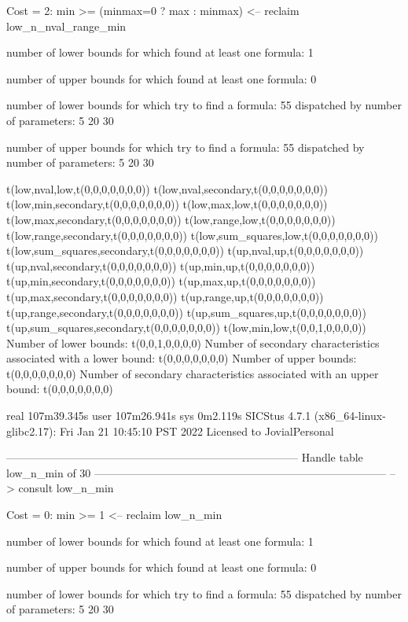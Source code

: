 Cost =  2:  min >= (minmax=0 ? max : minmax)
<-- reclaim low_n_nval_range_min

number of lower bounds for which found at least one formula: 1

number of upper bounds for which found at least one formula: 0

number of lower bounds for which try to find a formula: 55
dispatched by number of parameters: 5  20  30

number of upper bounds for which try to find a formula: 55
dispatched by number of parameters: 5  20  30

t(low,nval,low,t(0,0,0,0,0,0,0))
t(low,nval,secondary,t(0,0,0,0,0,0,0))
t(low,min,secondary,t(0,0,0,0,0,0,0))
t(low,max,low,t(0,0,0,0,0,0,0))
t(low,max,secondary,t(0,0,0,0,0,0,0))
t(low,range,low,t(0,0,0,0,0,0,0))
t(low,range,secondary,t(0,0,0,0,0,0,0))
t(low,sum_squares,low,t(0,0,0,0,0,0,0))
t(low,sum_squares,secondary,t(0,0,0,0,0,0,0))
t(up,nval,up,t(0,0,0,0,0,0,0))
t(up,nval,secondary,t(0,0,0,0,0,0,0))
t(up,min,up,t(0,0,0,0,0,0,0))
t(up,min,secondary,t(0,0,0,0,0,0,0))
t(up,max,up,t(0,0,0,0,0,0,0))
t(up,max,secondary,t(0,0,0,0,0,0,0))
t(up,range,up,t(0,0,0,0,0,0,0))
t(up,range,secondary,t(0,0,0,0,0,0,0))
t(up,sum_squares,up,t(0,0,0,0,0,0,0))
t(up,sum_squares,secondary,t(0,0,0,0,0,0,0))
t(low,min,low,t(0,0,1,0,0,0,0))
Number of lower bounds:                                             t(0,0,1,0,0,0,0)
Number of secondary characteristics associated with a lower bound:  t(0,0,0,0,0,0,0)
Number of upper bounds:                                             t(0,0,0,0,0,0,0)
Number of secondary characteristics associated with an upper bound: t(0,0,0,0,0,0,0)

real	107m39.345s
user	107m26.941s
sys	0m2.119s
SICStus 4.7.1 (x86_64-linux-glibc2.17): Fri Jan 21 10:45:10 PST 2022
Licensed to JovialPersonal


--------------------------------------------------------------------------------
Handle table low_n_min of 30
--------------------------------------------------------------------------------
--> consult low_n_min

Cost =  0:  min >= 1
<-- reclaim low_n_min

number of lower bounds for which found at least one formula: 1

number of upper bounds for which found at least one formula: 0

number of lower bounds for which try to find a formula: 55
dispatched by number of parameters: 5  20  30

